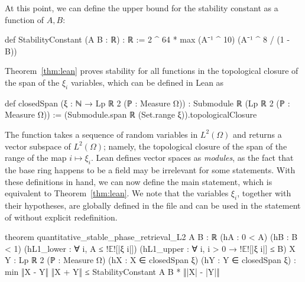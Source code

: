 \documentclass[11pt]{amsart}
\numberwithin{equation}{section}
\theoremstyle{definition}
\theoremstyle{remark}
\begin{document}
    
At this point, we can define the upper bound for the stability constant as a function of $A,B$:
\begin{leancode}
def StabilityConstant (A B : ℝ) : ℝ :=
  2 ^ 64 * max (A⁻¹ ^ 10) (A⁻¹ ^ 8 / (1 - B))
\end{leancode}
Theorem~\ref{thm:lean} proves stability for all functions in the topological closure of the span of the $\xi_i$ variables, which can be defined in Lean as
\begin{leancode}
def closedSpan (ξ : ℕ → Lp ℝ 2 (ℙ : Measure Ω)) :
    Submodule ℝ (Lp ℝ 2 (ℙ : Measure Ω)) :=
  (Submodule.span ℝ (Set.range ξ)).topologicalClosure
\end{leancode}
The function  takes a sequence of random variables in $L^2(\Omega)$ and returns a vector subspace of $L^2(\Omega)$; namely, the topological closure of the span of the range of the map $i\mapsto \xi_i$. Lean defines vector spaces as \textit{modules}, as the fact that the base ring happens to be a field may be irrelevant for some statements.  With these definitions in hand, we can now define the main statement, which is equivalent to Theorem~\ref{thm:lean}. We note that the variables $\xi_i$, together with their hypotheses, are globally defined in the file and can be used in the statement of  without explicit redefinition.
\begin{leancode}
theorem quantitative_stable_phase_retrieval_L2
    {A B : ℝ} (hA : 0 < A) (hB : B < 1)
    (hL1_lower : ∀ i, A ≤ !$\mathbb E$![|ξ i|])
    (hL1_upper : ∀ i, i > 0 → !$\mathbb E$![|ξ i|] ≤ B)
    {X Y : Lp ℝ 2 (ℙ : Measure Ω)}
    (hX : X ∈ closedSpan ξ) (hY : Y ∈ closedSpan ξ)
    : 
    min ‖X - Y‖ ‖X + Y‖ ≤ StabilityConstant A B * ‖|X| - |Y|‖
\end{leancode}





\end{document}
